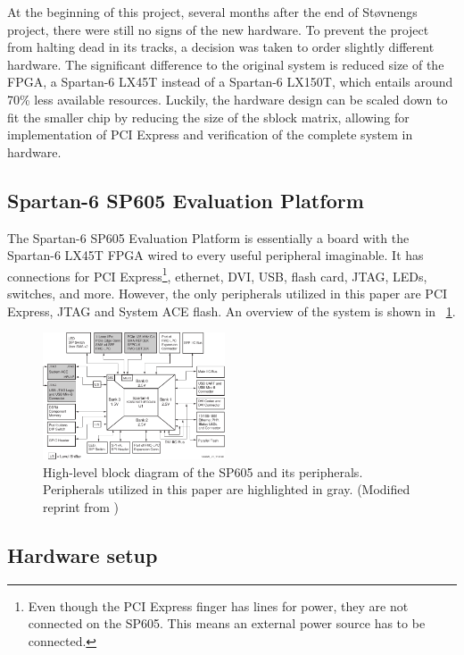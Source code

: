 At the beginning of this project, several months after the end of Støvnengs project, there were still no signs of the new hardware.
To prevent the project from halting dead in its tracks, a decision was taken to order slightly different hardware.
The significant difference to the original system is reduced size of the FPGA, a Spartan-6 LX45T instead of a Spartan-6 LX150T, which entails around 70\% less available resources.
Luckily, the hardware design can be scaled down to fit the smaller chip by reducing the size of the sblock matrix, allowing for implementation of PCI Express and verification of the complete system in hardware.

\subsection{Spartan-6 SP605 Evaluation Platform}

The Spartan-6 SP605 Evaluation Platform is essentially a board with the Spartan-6 LX45T FPGA wired to every useful peripheral imaginable.
It has connections for PCI Express\footnote{
        Even though the PCI Express finger has lines for power, they are not connected on the SP605. This means an external power source has to be connected.
    }, ethernet, DVI, USB, flash card, JTAG, LEDs, switches, and more.
However, the only peripherals utilized in this paper are PCI Express, JTAG and System ACE flash.
An overview of the system is shown in \figurename~\ref{fig:sp605}.

\begin{figure}[!ht]
    \centering
    \includegraphics[width=0.48\textwidth]{figures/sp605-modified}
    \caption{High-level block diagram of the SP605 and its peripherals. Peripherals utilized in this paper are highlighted in gray. (Modified reprint from \cite{ug526})}
    \label{fig:sp605}
\end{figure}


\subsection{Hardware setup}

